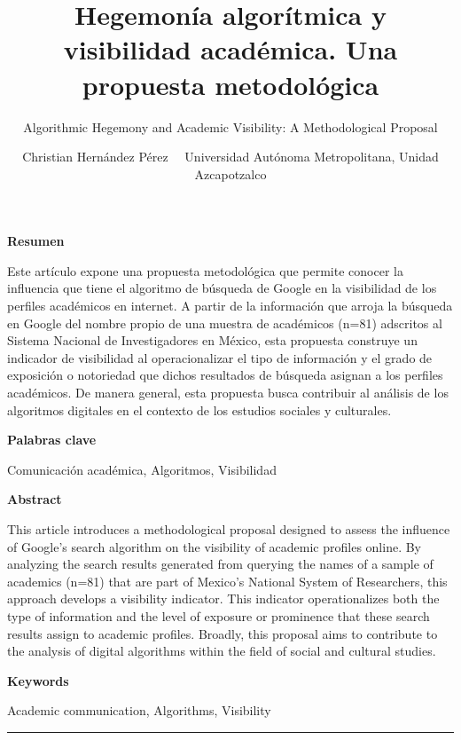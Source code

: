 \documentclass[
]{interact}
\title{Hegemonía algorítmica y visibilidad académica. Una propuesta
metodológica}
\subtitle{Algorithmic Hegemony and Academic Visibility: A Methodological
Proposal}
\author{Christian Hernández Pérez \textbar\ \textbar\ 
Universidad Autónoma Metropolitana, Unidad Azcapotzalco}
\begin{document}
\captionsetup{labelsep=space}
\maketitle


\newcommand{\articuloTitulo}{Hegemonía algorítmica}

\begin{footnotesize}
\textbf{Resumen}

Este artículo expone una propuesta metodológica que permite conocer la influencia que tiene el algoritmo de búsqueda de Google en la visibilidad de los perfiles académicos en internet. A partir de la información que arroja la búsqueda en Google del nombre propio de una muestra de académicos (n=81) adscritos al Sistema Nacional de Investigadores en México, esta propuesta construye un indicador de visibilidad al operacionalizar el tipo de información y el grado de exposición o notoriedad que dichos resultados de búsqueda asignan a los perfiles académicos. De manera general, esta propuesta busca contribuir al análisis de los algoritmos digitales en el contexto de los estudios sociales y culturales.

\textbf{Palabras clave}

Comunicación académica, Algoritmos, Visibilidad
\end{footnotesize}

\newpage

\begin{footnotesize}
\textbf{Abstract}

This article introduces a methodological proposal designed to assess the influence of Google's search algorithm on the visibility of academic profiles online. By analyzing the search results generated from querying the names of a sample of academics (n=81) that are part of Mexico's National System of Researchers, this approach develops a visibility indicator. This indicator operationalizes both the type of information and the level of exposure or prominence that these search results assign to academic profiles. Broadly, this proposal aims to contribute to the analysis of digital algorithms within the field of social and cultural studies.

\textbf{Keywords}

Academic communication, Algorithms, Visibility
\end{footnotesize}

\begin{center}\rule{0.5\linewidth}{0.5pt}\end{center}
\end{document}
